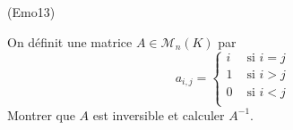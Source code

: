 \begin{tiny}(Emo13)\end{tiny} On définit une matrice $A\in\mathcal{M}_n(K)$ par
\[
 a_{i,j}=
\left\lbrace 
\begin{aligned}
 i &\text{ si } i=j\\
 1 &\text{ si } i>j\\
 0 &\text{ si } i<j\\
\end{aligned}
\right. 
\]
Montrer que $A$ est inversible et calculer $A^{-1}$.
